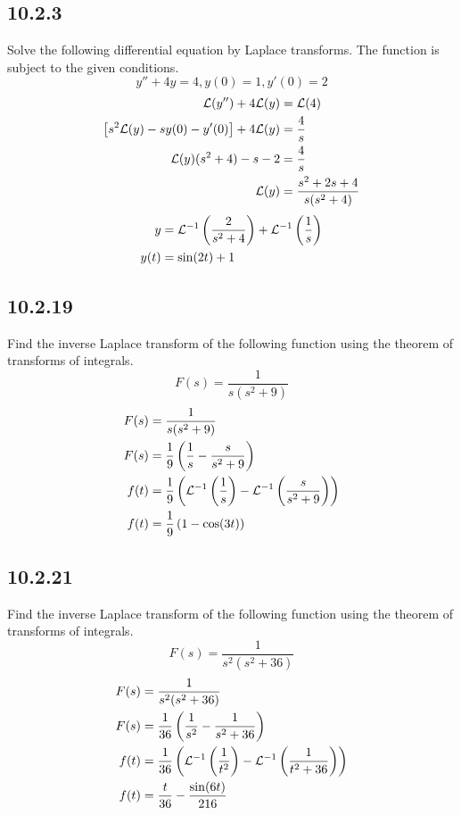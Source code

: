 \documentclass{article}
\begin{document}
\subsection{10.2.3}

Solve the following differential equation by Laplace transforms. The function is subject to the given conditions.
\begin{equation*}
	y'' + 4y = 4, y(0) = 1, y'(0) = 2
\end{equation*}
\begin{align*}
	\mathcal{L}(y'') + 4\mathcal{L}(y) & = \mathcal{L}(4) \\
	\left[ s^2\mathcal{L}(y) - sy(0) - y'(0) \right] + 4\mathcal{L}(y) & = \frac{4}{s} \\
	\mathcal{L}(y)(s^2 + 4) - s - 2 & = \frac{4}{s} \\
	\mathcal{L}(y) & = \frac{s^2 + 2s + 4}{s(s^2 + 4)}
\end{align*}
\begin{align*}
	y & = \mathcal{L}^{-1} \left( \frac{2}{s^2 + 4} \right) + \mathcal{L}^{-1} \left( \frac{1}{s} \right) \\
	y(t) & = \sin(2t) + 1
\end{align*}

\subsection{10.2.19}

Find the inverse Laplace transform of the following function using the theorem of transforms of integrals.
\begin{equation*}
	F(s) = \frac{1}{s(s^2 + 9)}
\end{equation*}
\begin{align*}
	F(s) & = \frac{1}{s(s^2 + 9)} \\
	F(s) & = \frac{1}{9} \left( \frac{1}{s} - \frac{s}{s^2 + 9} \right) \\
	f(t) & = \frac{1}{9} \left( \mathcal{L}^{-1} \left( \frac{1}{s} \right) - \mathcal{L}^{-1} \left( \frac{s}{s^2 + 9} \right) \right) \\
	f(t) & = \frac{1}{9} \left( 1 - \cos(3t) \right)
\end{align*}

\subsection{10.2.21}

Find the inverse Laplace transform of the following function using the theorem of transforms of integrals.
\begin{equation*}
	F(s) = \frac{1}{s^2(s^2 + 36)}
\end{equation*}
\begin{align*}
	F(s) & = \frac{1}{s^2(s^2 + 36)} \\
	F(s) & = \frac{1}{36} \left( \frac{1}{s^2} - \frac{1}{s^2 + 36} \right) \\
	f(t) & = \frac{1}{36} \left( \mathcal{L}^{-1} \left( \frac{1}{t^2} \right) - \mathcal{L}^{-1} \left( \frac{1}{t^2 + 36} \right) \right) \\
	f(t) & = \frac{t}{36} - \frac{\sin(6t)}{216}
\end{align*}
\end{document}
